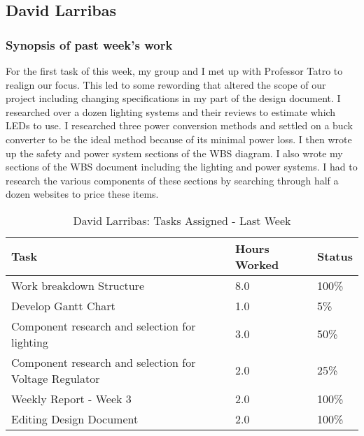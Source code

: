 \documentclass[12pt,compsoc]{IEEEtran}
\begin{document}
\subsection{David Larribas}

	\subsubsection*{Synopsis of past week's work}

	For the first task of this week, my group and I met up with Professor Tatro to realign our focus. 
	This led to some rewording that altered the scope of our project including changing specifications 
	in my part of the design document. I researched over a dozen lighting systems and their reviews to 
	estimate which LEDs to use. I researched three power conversion methods and settled on a buck 
	converter to be the ideal method because of its minimal power loss. I then wrote up the safety and 
	power system sections of the WBS diagram. I also wrote my sections of the WBS document including 
	the lighting and power systems. I had to research the various components of these sections by 
	searching through half a dozen websites to price these items.

	\begin{table}[ht]
	\renewcommand{\arraystretch}{1.3}
		\caption{David Larribas: Tasks Assigned - Last Week}
		
		\label{Summary of David Larribas' activities: last week}
		
		\centering
		\begin{tabular}{p{5.5cm}|p{1cm}|p{1cm}}
		\hline
		\bfseries 	Task		 	                        				& \bfseries Hours Worked	& \bfseries Status	\\
		\hline\hline
					Work breakdown Structure 								& 8.0				    	& 100\%				\\	
					Develop Gantt Chart										& 1.0						& 5\%               \\
                    Component research and selection for lighting 			& 3.0                       & 50\%              \\
                    Component research and selection for Voltage Regulator	& 2.0                       & 25\%              \\
                    Weekly Report - Week 3                                   & 2.0                       & 100\%         \\
                    Editing Design Document                                 & 2.0                       & 100\%
		\hline
		\end{tabular}
	\end{table}
\end{document}
